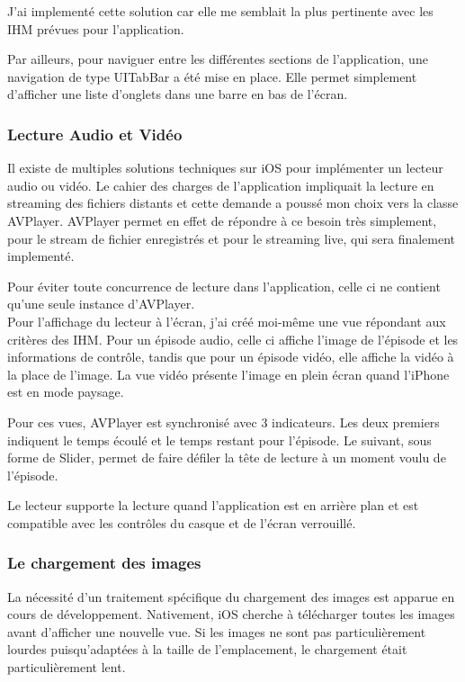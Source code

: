 \documentclass[11pt, french]{report}
\begin{document}
J'ai implementé cette solution car elle me semblait la plus pertinente avec les IHM prévues pour l'application.

Par ailleurs, pour naviguer entre les différentes sections de l'application, une navigation de type UITabBar a été mise en place. Elle permet simplement d'afficher une liste d'onglets dans une barre en bas de l'écran.

\subsubsection{Lecture Audio et Vidéo}

Il existe de multiples solutions techniques sur iOS pour implémenter un lecteur audio ou vidéo. Le cahier des charges de l'application impliquait la lecture en streaming des fichiers distants et cette demande a poussé mon choix vers la classe AVPlayer. AVPlayer permet en effet de répondre à ce besoin très simplement, pour le stream de fichier enregistrés et pour le streaming live, qui sera finalement implementé.

Pour éviter toute concurrence de lecture dans l'application, celle ci ne contient qu'une seule instance d'AVPlayer.\\

Pour l'affichage du lecteur à l'écran, j'ai créé moi-même une vue répondant aux critères des IHM. Pour un épisode audio, celle ci affiche l'image de l'épisode et les informations de contrôle, tandis que pour un épisode vidéo, elle affiche la vidéo à la place de l'image. La vue vidéo présente l'image en plein écran quand l'iPhone est en mode paysage.

Pour ces vues, AVPlayer est synchronisé avec 3 indicateurs. Les deux premiers indiquent le temps écoulé et le temps restant pour l'épisode. Le suivant, sous forme de Slider, permet de faire défiler la tête de lecture à un moment voulu de l'épisode.

Le lecteur supporte la lecture quand l'application est en arrière plan et est compatible avec les contrôles du casque et de l'écran verrouillé.

\subsubsection{Le chargement des images}

La nécessité d'un traitement spécifique du chargement des images est apparue en cours de développement. Nativement, iOS cherche à télécharger toutes les images avant d'afficher une nouvelle vue. Si les images ne sont pas particulièrement lourdes puisqu'adaptées à la taille de l'emplacement, le chargement était particulièrement lent.
\end{document}
